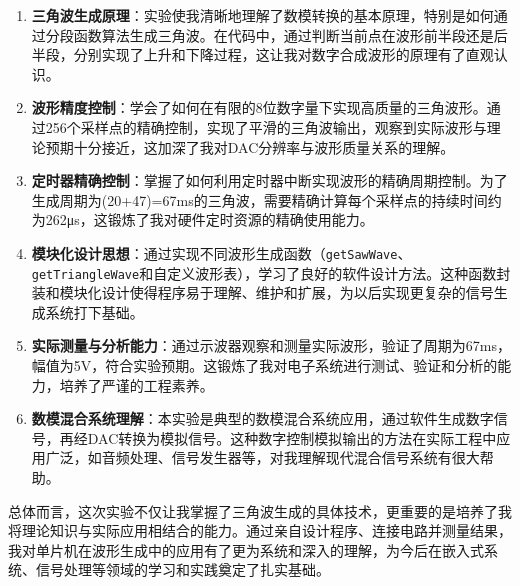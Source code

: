 \documentclass[12pt,hyperref,a4paper,UTF8]{ctexart}
\begin{document}
\begin{enumerate}
    \item \textbf{三角波生成原理}：实验使我清晰地理解了数模转换的基本原理，特别是如何通过分段函数算法生成三角波。在代码中，通过判断当前点在波形前半段还是后半段，分别实现了上升和下降过程，这让我对数字合成波形的原理有了直观认识。
    
    \item \textbf{波形精度控制}：学会了如何在有限的8位数字量下实现高质量的三角波形。通过256个采样点的精确控制，实现了平滑的三角波输出，观察到实际波形与理论预期十分接近，这加深了我对DAC分辨率与波形质量关系的理解。
    
    \item \textbf{定时器精确控制}：掌握了如何利用定时器中断实现波形的精确周期控制。为了生成周期为(20+47)=67ms的三角波，需要精确计算每个采样点的持续时间约为262μs，这锻炼了我对硬件定时资源的精确使用能力。
    
    \item \textbf{模块化设计思想}：通过实现不同波形生成函数（\texttt{getSawWave}、\texttt{getTriangleWave}和自定义波形表），学习了良好的软件设计方法。这种函数封装和模块化设计使得程序易于理解、维护和扩展，为以后实现更复杂的信号生成系统打下基础。
    
    \item \textbf{实际测量与分析能力}：通过示波器观察和测量实际波形，验证了周期为67ms，幅值为5V，符合实验预期。这锻炼了我对电子系统进行测试、验证和分析的能力，培养了严谨的工程素养。
    
    \item \textbf{数模混合系统理解}：本实验是典型的数模混合系统应用，通过软件生成数字信号，再经DAC转换为模拟信号。这种数字控制模拟输出的方法在实际工程中应用广泛，如音频处理、信号发生器等，对我理解现代混合信号系统有很大帮助。
\end{enumerate}

总体而言，这次实验不仅让我掌握了三角波生成的具体技术，更重要的是培养了我将理论知识与实际应用相结合的能力。通过亲自设计程序、连接电路并测量结果，我对单片机在波形生成中的应用有了更为系统和深入的理解，为今后在嵌入式系统、信号处理等领域的学习和实践奠定了扎实基础。
\end{document}
